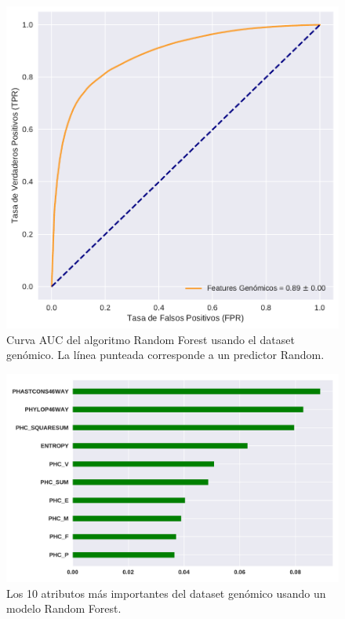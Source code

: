 \begin{figure}[H]
    \centering
    \includegraphics[scale=0.55]{documents/latex/figures/3/auc_2.pdf}
    \caption{Curva AUC del algoritmo Random Forest usando el dataset genómico. La línea punteada corresponde a un predictor Random.}
    \label{fig:auc_2}
\end{figure}

\begin{figure}[H]
    \centering
    \includegraphics[scale=0.55]{documents/latex/figures/3/importance_2.pdf}
    \caption{Los 10 atributos más importantes del dataset genómico usando un modelo Random Forest. }
    \label{fig:importance_2}
\end{figure}

